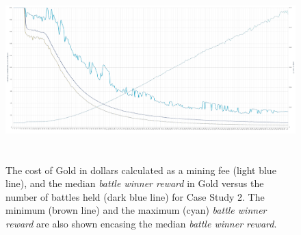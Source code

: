 \documentclass[12pt]{article}
\begin{document}
{%




\begin{figure}[H]
	\begin{Center}
		\includegraphics[width=6.27in,height=2.76in]{./media/CS2nimage19.png}
		\caption{The cost of Gold in dollars calculated as a mining fee (light blue line), and the median {\it battle winner reward} in Gold versus the number of battles held (dark blue line) for Case Study 2.   The minimum (brown line) and the maximum (cyan) {\it battle winner reward} are also shown encasing the median {\it battle winner reward}.}
		\label{The cost of Gold in dollars calculated as a mining fee (light blue line), and the median battle reward in Gold versus the number of battles held (dark blue line).}
	\end{Center}
\end{figure}




}
\end{document}

